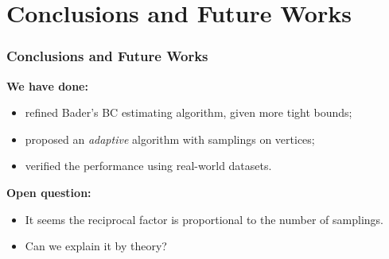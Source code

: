 \documentclass[12pt]{beamer}
\begin{document}
\section{Conclusions and Future Works}
\begin{frame}
	\frametitle{Conclusions and Future Works}
	{\bf We have done:}
	\begin{itemize}
		\item refined Bader's BC estimating algorithm, given more tight bounds;
		\item proposed an \emph{adaptive} algorithm with samplings on vertices;
		\item verified the performance using real-world datasets.
	\end{itemize}
	{\bf Open question:}
	\begin{itemize}
	 \item It seems the reciprocal factor is proportional to the number of samplings.
	\item Can we explain it by theory?
	\end{itemize}
\end{frame}
\end{document}
